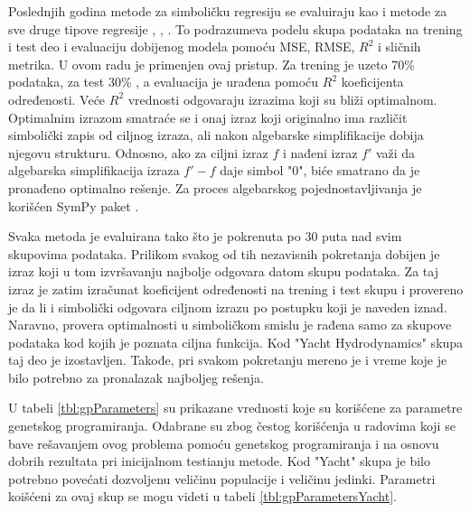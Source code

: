\documentclass[main.tex]{subfiles}
\begin{document}
Poslednjih godina metode za simboličku regresiju se evaluiraju kao i metode za sve druge tipove regresije \cite{GPIncompleteData}, \cite{linearScalingGP}, \cite{benchmarkStudy}. To podrazumeva podelu skupa podataka na trening i test deo i evaluaciju dobijenog modela pomoću MSE, RMSE, $R^2$ i sličnih metrika. U ovom radu je primenjen ovaj pristup. Za trening je uzeto 70\% podataka, za test 30\% , a evaluacija je urađena pomoću $R^2$ koeficijenta određenosti. Veće $R^2$ vrednosti odgovaraju izrazima koji su bliži optimalnom. Optimalnim izrazom smatraće se i onaj izraz koji originalno ima različit simbolički zapis od ciljnog izraza, ali nakon algebarske simplifikacije dobija njegovu strukturu. Odnosno, ako za ciljni izraz $f$ i nađeni izraz $f'$ važi da algebarska simplifikacija izraza $f' - f$ daje simbol "0", biće smatrano da je pronađeno optimalno rešenje. Za proces algebarskog pojednostavljivanja je korišćen SymPy paket \cite{sympy}.

Svaka metoda je evaluirana tako što je pokrenuta po 30 puta nad svim skupovima podataka. Prilikom svakog od tih nezavisnih pokretanja dobijen je izraz koji u tom izvršavanju najbolje odgovara datom skupu podataka. Za taj izraz je zatim izračunat koeficijent određenosti na trening i test skupu i provereno je da li i simbolički odgovara ciljnom izrazu po postupku koji je naveden iznad. Naravno, provera optimalnosti u simboličkom smislu je rađena samo za skupove podataka kod kojih je poznata ciljna funkcija. Kod "Yacht Hydrodynamics" skupa taj deo je izostavljen. Takođe, pri svakom pokretanju mereno je i vreme koje je bilo potrebno za pronalazak najboljeg rešenja.

U tabeli \ref{tbl:gpParameters} su prikazane vrednosti koje su korišćene za parametre genetskog programiranja. Odabrane su zbog čestog korišćenja u radovima koji se bave rešavanjem ovog problema pomoću genetskog programiranja i na osnovu dobrih rezultata pri inicijalnom testianju metode.
Kod "Yacht" skupa je bilo potrebno povećati dozvoljenu veličinu populacije i veličinu jedinki. Parametri koišćeni za ovaj skup se mogu videti u tabeli \ref{tbl:gpParametersYacht}. 
\end{document}
